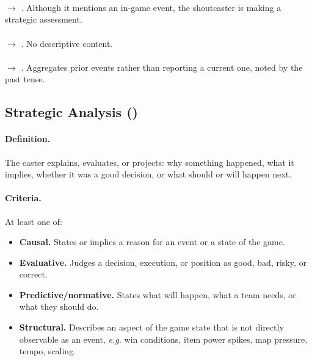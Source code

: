 \begin{agexample}
\\[2pt]
\\[2pt]
\end{agexample}

\begin{agexample}
\\
\hspace*{1em}$\rightarrow$ \SA{}. Although it mentions an in-game event, the shoutcaster is making a strategic assessment.\\[4pt]
\\
\hspace*{1em}$\rightarrow$ \HYP{}. No descriptive content.\\[4pt]
\\
\hspace*{1em}$\rightarrow$ \REC{}. Aggregates prior events rather than
reporting a current one, noted by the past tense.
\end{agexample}

\subsection{Strategic Analysis (\cSA{})}
\label{sec:def-sa}

\paragraph{Definition.} The caster explains, evaluates, or projects: why
something happened, what it implies, whether it was a good decision, or
what should or will happen next.

\paragraph{Criteria.} At least one of:
\begin{itemize}
  \item \textbf{Causal.} States or implies a reason for an event or a state of the game.
  \item \textbf{Evaluative.} Judges a decision, execution, or position as good, bad, risky, or correct.
  \item \textbf{Predictive/normative.} States what will happen, what a team needs, or what they should do.
  \item \textbf{Structural.} Describes an aspect of the game state that is not directly observable as an event, \textit{e.g.} win conditions, item power spikes, map pressure, tempo, scaling.
\end{itemize}

